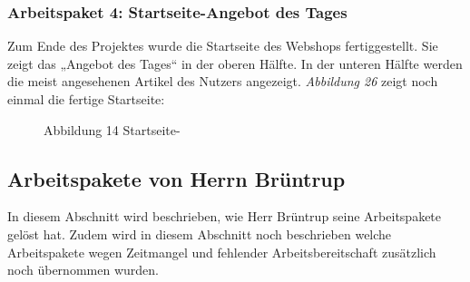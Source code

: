 
\subsubsection{Arbeitspaket 4: Startseite-Angebot des Tages}

Zum Ende des Projektes wurde die Startseite des Webshops fertiggestellt. Sie zeigt das „Angebot des Tages“ in der oberen Hälfte. In der unteren Hälfte werden die meist angesehenen Artikel des Nutzers angezeigt. \textit{Abbildung 26} zeigt noch einmal die fertige Startseite:

\begin{figure}[H]
\begin{center}
\end{center}
\caption{Abbildung 14 Startseite-\grqq{}}
\end{figure}



\subsection{Arbeitspakete von Herrn Brüntrup}
In diesem Abschnitt wird beschrieben, wie Herr Brüntrup seine Arbeitspakete gelöst hat. Zudem wird in diesem Abschnitt noch beschrieben welche Arbeitspakete wegen Zeitmangel und fehlender Arbeitsbereitschaft zusätzlich noch übernommen wurden.

